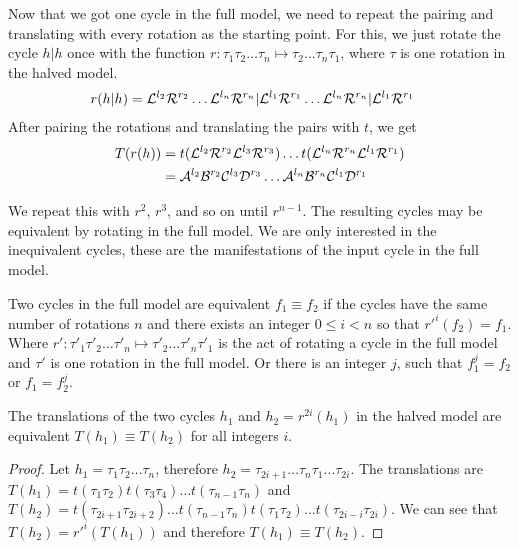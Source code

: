 Now that we got one cycle in the full model, we need to repeat the pairing and translating with every rotation as the starting point.
For this, we just rotate the cycle $h|h$ once with the function $r: \tau_1\tau_2 \dots \tau_n \mapsto \tau_2 \dots \tau_n\tau_1$, where $\tau$ is one rotation in the halved model.
\begin{align}
	r(h|h) & = \mathcal{L}^{l_2}\mathcal{R}^{r_2} \ldots \mathcal{L}^{l_n}\mathcal{R}^{r_n} | \mathcal{L}^{l_1}\mathcal{R}^{r_1} \ldots \mathcal{L}^{l_n}\mathcal{R}^{r_n} | \mathcal{L}^{l_1}\mathcal{R}^{r_1}
\end{align}
After pairing the rotations and translating the pairs with $t$, we get
\begin{subequations}
	\begin{align}
		T(r(h)) & = t(\mathcal{L}^{l_2}\mathcal{R}^{r_2}\mathcal{L}^{l_3}\mathcal{R}^{r_3}) \dots t(\mathcal{L}^{l_{n}}\mathcal{R}^{r_{n}}\mathcal{L}^{l_1}\mathcal{R}^{r_1}) \\
		        & = \mathcal{A}^{l_2}\mathcal{B}^{r_2}\mathcal{C}^{l_3}\mathcal{D}^{r_3} \dots \mathcal{A}^{l_{n}}\mathcal{B}^{r_{n}}\mathcal{C}^{l_1}\mathcal{D}^{r_1}
	\end{align}
\end{subequations}

We repeat this with $r^2$, $r^3$, and so on until $r^{n-1}$.
The resulting cycles may be equivalent by rotating in the full model.
We are only interested in the inequivalent cycles, these are the manifestations of the input cycle in the full model.

\begin{definition}
	Two cycles in the full model are equivalent $f_1 \equiv f_2$ if the cycles have the same number of rotations $n$ and there exists an integer $0 \leq i < n$ so that $r'^i(f_2) = f_1$.
	Where $r': \tau'_1\tau'_2 \dots \tau'_n \mapsto \tau'_2 \dots \tau'_n\tau'_1$ is the act of rotating a cycle in the full model and $\tau'$ is one rotation in the full model.
	Or there is an integer $j$, such that $f_1^j = f_2$ or $f_1 = f_2^j$.
\end{definition}

\begin{lemma}
	The translations of the two cycles $h_1$ and $h_2 = r^{2i}(h_1)$ in the halved model are equivalent $T(h_1) \equiv T(h_2)$ for all integers $i$.
\end{lemma}

\begin{proof}
	Let $h_1 = \tau_1\tau_2 \dots \tau_n$, therefore $h_2 = \tau_{2i+1} \dots \tau_n\tau_1 \dots \tau_{2i}$.
	The translations are $T(h_1) = t(\tau_1\tau_2)t(\tau_3\tau_4) \dots t(\tau_{n-1}\tau_n)$
	and $T(h_2) = t(\tau_{2i+1}\tau_{2i+2}) \dots t(\tau_{n-1}\tau_n)t(\tau_1\tau_2) \dots t(\tau_{2i-i}\tau_{2i})$.
	We can see that $T(h_2) = r'^i(T(h_1))$ and therefore $T(h_1) \equiv T(h_2)$.
\end{proof}

